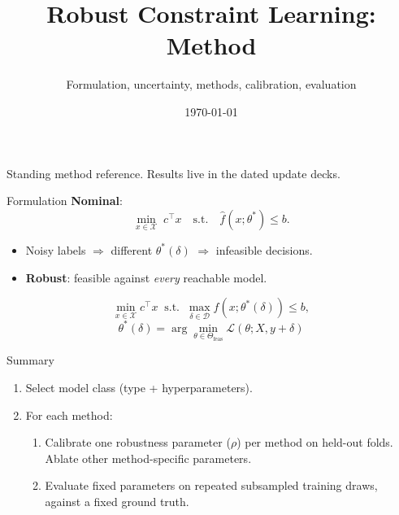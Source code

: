 \documentclass{beamer}
\title{Robust Constraint Learning: Method}
\subtitle{Formulation, uncertainty, methods, calibration, evaluation}
\date{\today}
\begin{document}
\begin{frame}
  \titlepage
  \begin{center}\footnotesize
  Standing method reference. Results live in the dated update decks.
  \end{center}
\end{frame}

\begin{frame}{Formulation}
  \textbf{Nominal}:
  \[
    \min_{x\in\mathcal{X}}\; c^\top x \quad\text{s.t.}\quad \hat f(x;\theta^\ast)\le b .
  \]
  \begin{itemize}
    \item Noisy labels $\Rightarrow$ different $\theta^\ast(\delta)$ $\Rightarrow$ infeasible
      decisions.
    \item \textbf{Robust}: feasible against \emph{every} reachable model.
  \end{itemize}
  \[
    \min_{x\in\mathcal{X}} c^\top x
    \;\;\text{s.t.}\;\; \max_{\delta\in\mathcal{D}} f(x;\theta^\ast(\delta))\le b,
  \]
  \[
    \theta^\ast(\delta)=\arg\min_{\theta\in\Theta_{\text{feas}}}\mathcal L(\theta;X,y+\delta)
  \]
\end{frame}

\begin{frame}{Summary}
  \begin{enumerate}
    \item Select model class (type + hyperparameters).
    \item For each method:
      \begin{enumerate}
        \item Calibrate one robustness parameter ($\rho$) per method on held-out
              folds. Ablate other method-specific parameters.
        \item Evaluate fixed parameters on repeated subsampled training draws,
              against a fixed ground truth.
      \end{enumerate}
  \end{enumerate}
\end{frame}
\end{document}
